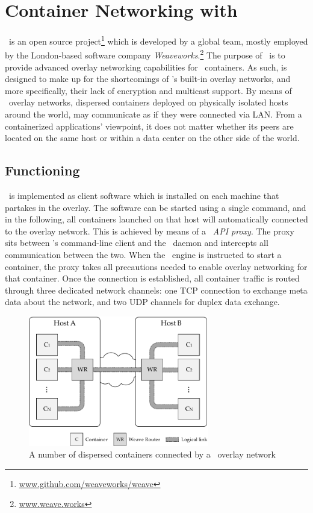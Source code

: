 
\section{Container Networking with \wnet}
\wnet\ is an open source project\footnote{\url{www.github.com/weaveworks/weave}} which is developed by a global team, mostly employed by the London-based software company \emph{Weaveworks}.\footnote{\url{www.weave.works}} The purpose of \wnet\ is to provide advanced overlay networking capabilities for \docker\ containers. As such, is designed to make up for the shortcomings of \docker 's built-in overlay networks, and more specifically, their lack of encryption and multicast support. By means of \weave\ overlay networks, dispersed containers deployed on physically isolated hosts around the world, may communicate as if they were connected via LAN. From a containerized applications' viewpoint, it does not matter whether its peers are located on the same host or within a data center on the other side of the world.

\subsection{Functioning}
\wnet\ is implemented as client software which is installed on each machine that partakes in the overlay. The software can be started using a single command, and in the following, all containers launched on that host will automatically connected to the overlay network. This is achieved by means of a \emph{\docker\ API proxy}. The proxy sits between \docker 's command-line client and the \docker\ daemon and intercepts all communication between the two. When the \docker\ engine is instructed to start a container, the proxy takes all precautions needed to enable overlay networking for that container. Once the connection is established, all container traffic is routed through three dedicated network channels: one TCP connection to exchange meta data about the network, and two UDP channels for duplex data exchange.

\begin{figure}[htpb]
  \centering
  \includegraphics[width=0.7\textwidth]{figures/weave.pdf}
  \caption[An example of containers connected via \wnet\ overlay network]{A number of dispersed containers connected by a \wnet\ overlay network}\label{fig:weavescheme}
\end{figure}

